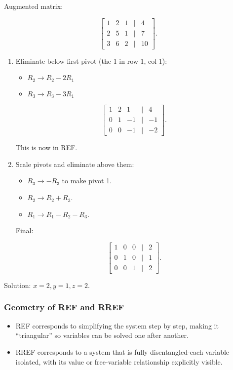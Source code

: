 \documentclass[
  letterpaper,
  DIV=11,
  numbers=noendperiod]{scrreprt}
\providecommand{\tightlist}{%
  \setlength{\itemsep}{0pt}\setlength{\parskip}{0pt}}
\begin{document}
Augmented matrix:

\[
\begin{bmatrix}  
1 & 2 & 1 & | & 4 \\  
2 & 5 & 1 & | & 7 \\  
3 & 6 & 2 & | & 10  
\end{bmatrix}.
\]

\begin{enumerate}
\def\labelenumi{\arabic{enumi}.}
\item
  Eliminate below first pivot (the 1 in row 1, col 1):

  \begin{itemize}
  \tightlist
  \item
    \(R_2 \to R_2 - 2R_1\)
  \item
    \(R_3 \to R_3 - 3R_1\)
  \end{itemize}

  \[
  \begin{bmatrix}  
  1 & 2 & 1 & | & 4 \\  
  0 & 1 & -1 & | & -1 \\  
  0 & 0 & -1 & | & -2  
  \end{bmatrix}.
  \]

  This is now in REF.
\item
  Scale pivots and eliminate above them:

  \begin{itemize}
  \tightlist
  \item
    \(R_3 \to -R_3\) to make pivot 1.
  \item
    \(R_2 \to R_2 + R_3\).
  \item
    \(R_1 \to R_1 - R_2 - R_3\).
  \end{itemize}

  Final:

  \[
  \begin{bmatrix}  
  1 & 0 & 0 & | & 2 \\  
  0 & 1 & 0 & | & 1 \\  
  0 & 0 & 1 & | & 2  
  \end{bmatrix}.
  \]
\end{enumerate}

Solution: \(x=2, y=1, z=2\).

\subsubsection{Geometry of REF and RREF}\label{geometry-of-ref-and-rref}

\begin{itemize}
\tightlist
\item
  REF corresponds to simplifying the system step by step, making it
  ``triangular'' so variables can be solved one after another.
\item
  RREF corresponds to a system that is fully disentangled-each variable
  isolated, with its value or free-variable relationship explicitly
  visible.
\end{itemize}
\end{document}
